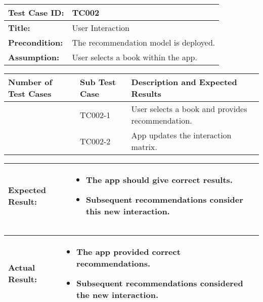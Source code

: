 \noindent
\begin{tabularx}{\textwidth}{|>{\raggedright\arraybackslash}p{4cm}|X|}
    \hline
    \textbf{Test Case ID:} & TC002 \\ \hline
    \textbf{Title:} & User Interaction \\ \hline
    \textbf{Precondition:} & The recommendation model is deployed. \\ \hline
    \textbf{Assumption:} & User selects a book within the app. \\ \hline
\end{tabularx}

\noindent
\begin{tabularx}{\textwidth}{|>{\centering\arraybackslash}p{3cm}|>{\centering\arraybackslash}p{3cm}|X|}
    \hline
    \textbf{Number of Test Cases} & \textbf{Sub Test Case} & \textbf{Description and Expected Results} \\ \hline
    1 & TC002-1 & User selects a book and provides recommendation. \\ \hline
    2 & TC002-2 & App updates the interaction matrix. \\ \hline
\end{tabularx}

\noindent
\begin{tabularx}{\textwidth}{|>{\raggedright\arraybackslash}p{4cm}|X|}
    \hline
    \textbf{Expected Result:} & 
    \begin{itemize}
        \item The app should give correct results.
        \item Subsequent recommendations consider this new interaction.
    \end{itemize}
    \\ \hline
\end{tabularx}

\noindent
\begin{tabularx}{\textwidth}{|>{\raggedright\arraybackslash}p{4cm}|X|}
    \hline
    \textbf{Actual Result:} & 
    \begin{itemize}
        \item The app provided correct recommendations.
        \item Subsequent recommendations considered the new interaction.
    \end{itemize}
    \\ \hline
\end{tabularx}

